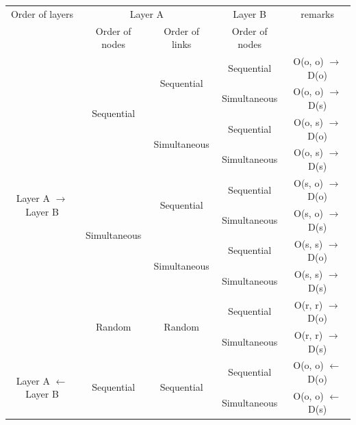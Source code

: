 \documentclass[review]{elsarticle}
\begin{document}
\begin{table}[htp]
	\scriptsize
	\begin{center}
		\begin{tabular}{c|c|c|c|c}
			Order of layers                                  & \multicolumn{2}{|c|}{Layer A}                                      & Layer B                & remarks   \\ \cline{2-4}
			& Order of nodes                 & Order of links                     & Order of nodes         &  \\ \hline
			\multirow{10}{*}{Layer A $\rightarrow$ Layer B} & \multirow{4}{*}{Sequential}    & \multirow{2}{*}{Sequential}        & Sequential             & O(o, o) $\to$ D(o) \\  \cline{4-5}  
			&                                &                                    & Simultaneous           & O(o, o) $\to$ D(s) \\  \cline{3-5}     
			&                                & \multirow{2}{*}{Simultaneous}      & Sequential             & O(o, s) $\to$ D(o) \\  \cline{4-5} 
			&                                &                                    & Simultaneous           & O(o, s) $\to$ D(s) \\  \cline{2-5} 
			& \multirow{4}{*}{Simultaneous}  & \multirow{2}{*}{Sequential}        & Sequential             & O(s, o) $\to$ D(o) \\  \cline{4-5}
			&                                &                                    & Simultaneous           & O(s, o) $\to$ D(s) \\  \cline{3-5}
			&                                & \multirow{2}{*}{Simultaneous}      & Sequential             & O(s, s) $\to$ D(o) \\  \cline{4-5}
			&                                &                                    & Simultaneous           & O(s, s) $\to$ D(s) \\  \cline{2-5}
			& \multirow{2}{*}{Random}        & \multirow{2}{*}{Random}            & Sequential             & O(r, r) $\to$ D(o) \\  \cline{4-5}
			&                                &                                    & Simultaneous           & O(r, r) $\to$ D(s) \\   \hline
			\multirow{10}{*}{Layer A $\leftarrow$ Layer B}  & \multirow{4}{*}{Sequential}    & \multirow{2}{*}{Sequential}        & Sequential             & O(o, o) $\leftarrow$ D(o) \\  \cline{4-5}  
			&                                &                                    & Simultaneous           & O(o, o) $\leftarrow$ D(s) \\  \cline{3-5}     

\end{tabular}
\end{center}
\end{table}
\end{document}
